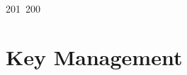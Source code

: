 201~200~\documentclass{article}
\begin{document}
	                                                                                                                                                                                                                                                                                                	                                                                                                                                        	    	                                                                                                	                                                                                                                                                                                                                                \section{Key Management}
\end{document}
